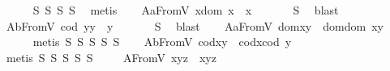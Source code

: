 \begin{isabellebody}
%
\isadelimproof
\ \ \ \ %
\endisadelimproof
%
\isatagproof
{}\isamarkupfalse%
\ S{}\ S{}\ S{}\ S{}\ \isamarkupfalse%
\ metis%
\endisatagproof
{\isafoldproof}%
%
\isadelimproof
\isanewline
%
\endisadelimproof
\ \ \isamarkupfalse%
\ A{}aFromV{\isacharcolon}\ {\isachardoublequoteopen}x{\isasymcdot}{\isacharparenleft}dom\ x{\isacharparenright}\ {\isasymcong}\ x{\isachardoublequoteclose}\ \isanewline
%
\isadelimproof
\ \ \ \ %
\endisadelimproof
%
\isatagproof
{}\isamarkupfalse%
\ S{}\ \isamarkupfalse%
\ blast%
\endisatagproof
{\isafoldproof}%
%
\isadelimproof
\isanewline
%
\endisadelimproof
\ \ \isamarkupfalse%
\ A{}bFromV{\isacharcolon}\ {\isachardoublequoteopen}{\isacharparenleft}cod\ y{\isacharparenright}{\isasymcdot}y\ {\isasymcong}\ y{\isachardoublequoteclose}\ \isanewline
%
\isadelimproof
\ \ \ \ %
\endisadelimproof
%
\isatagproof
{}\isamarkupfalse%
\ S{}\ \isamarkupfalse%
\ blast%
\endisatagproof
{\isafoldproof}%
%
\isadelimproof
\isanewline
%
\endisadelimproof
\ \ \isamarkupfalse%
\ A{}aFromV{\isacharcolon}\ {\isachardoublequoteopen}dom{\isacharparenleft}x{\isasymcdot}y{\isacharparenright}\ {\isasymcong}\ dom{\isacharparenleft}{\isacharparenleft}dom\ x{\isacharparenright}{\isasymcdot}y{\isacharparenright}{\isachardoublequoteclose}\isanewline
%
\isadelimproof
\ \ \ \ %
\endisadelimproof
%
\isatagproof
{}\isamarkupfalse%
\ {\isacharparenleft}metis\ S{}\ S{}\ S{}\ S{}\ S{}{\isacharparenright}%
\endisatagproof
{\isafoldproof}%
%
\isadelimproof
\isanewline
%
\endisadelimproof
\ \ \isamarkupfalse%
\ A{}bFromV{\isacharcolon}\ {\isachardoublequoteopen}cod{\isacharparenleft}x{\isasymcdot}y{\isacharparenright}\ {\isasymcong}\ cod{\isacharparenleft}x{\isasymcdot}{\isacharparenleft}cod\ y{\isacharparenright}{\isacharparenright}{\isachardoublequoteclose}\ \isanewline
%
\isadelimproof
\ \ \ \ %
\endisadelimproof
%
\isatagproof
{}\isamarkupfalse%
\ {\isacharparenleft}metis\ S{}\ S{}\ S{}\ S{}\ S{}{\isacharparenright}%
\endisatagproof
{\isafoldproof}%
%
\isadelimproof
\isanewline
%
\endisadelimproof
\ \ \isamarkupfalse%
\ \ A{}FromV{\isacharcolon}\ {\isachardoublequoteopen}x{\isasymcdot}{\isacharparenleft}y{\isasymcdot}z{\isacharparenright}\ {\isasymcong}\ {\isacharparenleft}x{\isasymcdot}y{\isacharparenright}{\isasymcdot}z{\isachardoublequoteclose}\ \isanewline

\end{isabellebody}
